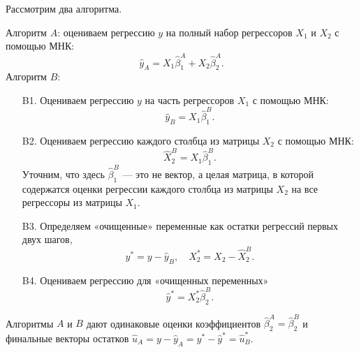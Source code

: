 \documentclass[12pt]{article}
\newcommand{\hb}{\hat{\beta}}
\newcommand{\hu}{\hat{u}}
\newcommand{\hy}{\hat{y}}
\begin{document}
\begin{theorem}

Рассмотрим два алгоритма. 

Алгоритм $A$: оцениваем регрессию $y$ на полный набор регрессоров $X_1$ и $X_2$ с помощью МНК:
\[
\hy_A = X_1 \hb_1^A  + X_2 \hb_2^A.
\]
Алгоритм $B$: 
\begin{enumerate}
    \item[B1.] Оцениваем регрессию $y$ на часть регрессоров $X_1$ с помощью МНК:
    \[
    \hy_{B} = X_1 \hb_1^{B}.
    \]
    \item[B2.] Оцениваем регрессию каждого столбца из матрицы $X_2$ с помощью МНК:
    \[
    \hat X_2^{B} = X_1 \hb_1^{B}.
    \]
    Уточним, что здесь $\hb_1^B$ — это не вектор, а целая матрица, в которой содержатся оценки регрессии каждого столбца из матрицы $X_2$ на все регрессоры из матрицы $X_1$.
    \item[B3.] Определяем «очищенные» переменные как остатки регрессий первых двух шагов,
    \[
    y^* = y - \hy_B, \quad X_2^* = X_2 - \hat X_2^B.
    \]
    \item[B4.] Оцениваем регрессию для «очищенных переменных»
    \[
    \hy^* = X_2^*\hb_2^B.
    \]
\end{enumerate}

Алгоритмы $A$ и $B$ дают одинаковые оценки коэффициентов $\hb_2^A = \hb_2^B$ и финальные векторы остатков $\hu_A = y - \hy_A = y^* - \hy^* = \hu^*_B$.
\end{theorem}
\end{document}
